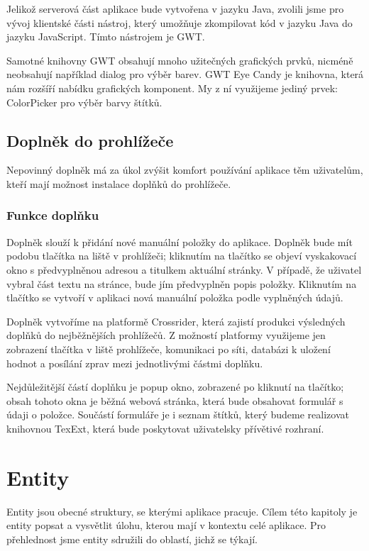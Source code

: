 Jelikož serverová část aplikace bude vytvořena v jazyku Java, zvolili jsme pro vývoj klientské části nástroj, který umožňuje zkompilovat kód v jazyku Java do jazyku JavaScript.
Tímto nástrojem je GWT.

Samotné knihovny GWT obsahují mnoho užitečných grafických prvků, nic\-mé\-ně neobsahují například dialog pro výběr barev.
GWT Eye Candy je knihovna, která nám rozšíří nabídku grafických komponent.
My z ní využijeme jediný prvek: ColorPicker pro výběr barvy štítků.

\subsection{Doplněk do prohlížeče}

Nepovinný doplněk má za úkol zvýšit komfort používání aplikace těm uživatelům, kteří mají možnost instalace doplňků do prohlížeče.

\subsubsection{Funkce doplňku}

Doplněk slouží k přidání nové manuální položky do aplikace.
Doplněk bude mít podobu tlačítka na liště v prohlížeči; kliknutím na tlačítko se objeví vyskakovací okno s předvyplněnou adresou a titulkem aktuální stránky.
V případě, že uživatel vybral část textu na stránce, bude jím předvyplněn popis položky.
Kliknutím na tlačítko  se vytvoří v aplikaci nová manuální položka podle vyplněných údajů.

\bigskip

Doplněk vytvoříme na platformě Crossrider, která zajistí produkci výsledných doplňků do nejběžnějších prohlížečů.
Z možností platformy využijeme jen zobrazení tlačítka v liště prohlížeče, komunikaci po síti, databázi k uložení hodnot a posílání zprav mezi jednotlivými částmi doplňku.

Nejdůležitější částí doplňku je popup okno, zobrazené po kliknutí na tlačítko; obsah tohoto okna je běžná webová stránka, která bude obsahovat formulář s údaji o položce.
Součástí formuláře je i seznam štítků, který budeme realizovat knihovnou TexExt, která bude poskytovat uživatelsky přívětivé rozhraní.

\section{Entity}

Entity jsou obecné struktury, se kterými aplikace pracuje.
Cílem této kapitoly je entity popsat a vysvětlit úlohu, kterou mají v kontextu celé aplikace.
Pro přehlednost jsme entity sdružili do oblastí, jichž se týkají.

